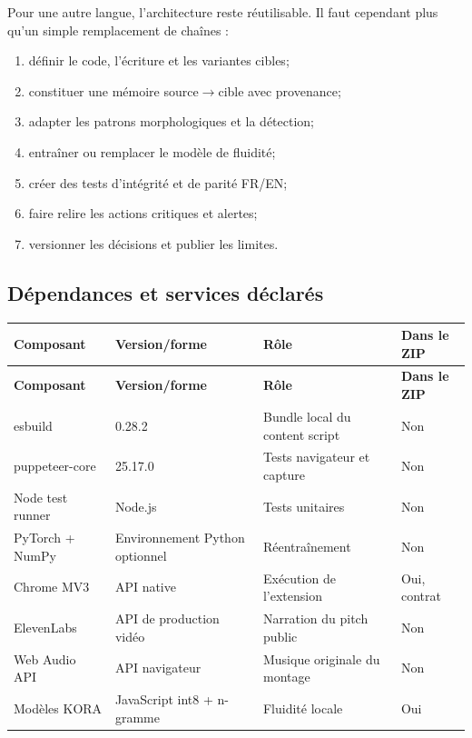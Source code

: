 Pour une autre langue, l’architecture reste réutilisable. Il faut cependant
plus qu’un simple remplacement de chaînes :

\begin{enumerate}
  \item définir le code, l’écriture et les variantes cibles;
  \item constituer une mémoire source$\rightarrow$cible avec provenance;
  \item adapter les patrons morphologiques et la détection;
  \item entraîner ou remplacer le modèle de fluidité;
  \item créer des tests d’intégrité et de parité FR/EN;
  \item faire relire les actions critiques et alertes;
  \item versionner les décisions et publier les limites.
\end{enumerate}

\subsection{Dépendances et services déclarés}

\begin{longtable}{@{}|L{43mm}|L{35mm}|L{50mm}|L{28mm}|@{}}
\hline
\textbf{Composant} & \textbf{Version/forme} & \textbf{Rôle} &
\textbf{Dans le ZIP}\\
\hline
\endfirsthead
\hline
\textbf{Composant} & \textbf{Version/forme} & \textbf{Rôle} &
\textbf{Dans le ZIP}\\
\hline
\endhead
esbuild & 0.28.2 & Bundle local du content script & Non\\
\hline
puppeteer-core & 25.17.0 & Tests navigateur et capture & Non\\
\hline
Node test runner & Node.js & Tests unitaires & Non\\
\hline
PyTorch + NumPy & Environnement Python optionnel & Réentraînement & Non\\
\hline
Chrome MV3 & API native & Exécution de l’extension & Oui, contrat\\
\hline
ElevenLabs & API de production vidéo & Narration du pitch public & Non\\
\hline
Web Audio API & API navigateur & Musique originale du montage & Non\\
\hline
Modèles KORA & JavaScript int8 + n-gramme & Fluidité locale & Oui\\
\hline
\end{longtable}

